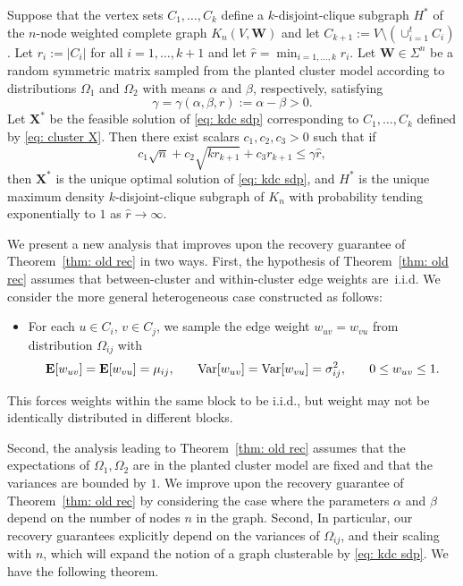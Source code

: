 \documentclass[twoside,11pt]{article}
\newcommand{\E}{\mathbf{E}}
\newcommand{\bs}{\boldsymbol}
\newcommand{\X}{\bs {X}}
\newcommand{\W}{\bs {W}}
\newcommand{\0}{\bs{0}}
\newcommand{\rbra}[1]{\ensuremath{\left( #1 \right)}} %
\newcommand{\ra}{\rightarrow}
\newcommand{\kdc}{\(k\)-disjoint-clique }
\begin{document}
{\begin{theorem}
	\label{thm: old rec}
	Suppose that the vertex sets \(C_1, \dots, C_k\) define a \kdc subgraph \(H^*\) of the
	\(n\)-node weighted complete graph \(K_n(V, \W)\) and let \(C_{k+1} := V \setminus \rbra{ \cup^t_{i=1} C_i } \).
	Let \(r_i := |C_i|\) for all \(i=1,\dots, k+1\)
	and let \( \hat r = \min_{i=1,\dots,k} r_i.\)
	Let \( \W \in \Sigma^n\) be a random symmetric matrix sampled from the planted cluster model
	according to distributions \(\Omega_1\) and \(\Omega_2\) with means \(\alpha\) and \( \beta\), respectively,	satisfying
	\[
	\gamma = \gamma(\alpha, \beta, r):=
	\alpha - \beta > 0.
	\]
	Let \(\X^*\) be the feasible solution of \eqref{eq: kdc sdp} corresponding to \(C_1,\dots, C_k\)
	defined by \eqref{eq: cluster X}.
	Then there exist scalars \(c_1, c_2, c_3 > 0\) such that if
	\begin{equation} \label{eq: old rec}
	c_1 \sqrt{n} + c_2 \sqrt{k r_{k+1}} + c_3 r_{k+1} \le \gamma \hat r,
	\end{equation}
	then \( \X^* \) is the unique optimal solution of \eqref{eq: kdc sdp},
	and \( H^*\) is the unique maximum density \kdc subgraph of \(K_n\)
	with probability tending exponentially to \(1\) as \(\hat r \ra \infty\).
\end{theorem}
%
We present a new analysis that improves upon the recovery guarantee of Theorem~\ref{thm: old rec} in two ways.
First, the hypothesis of Theorem~\ref{thm: old rec} assumes that between-cluster and within-cluster edge weights are~i.i.d. We consider the more general heterogeneous case constructed as follows:
\begin{itemize}
	\item For each $u \in C_i$, $v \in C_j$, we sample the edge weight $w_{uv} = w_{vu}$ from distribution $\Omega_{ij}$ with
	\[
	\E[w_{uv}]  = \E[w_{vu}] = \mu_{ij}, \hspace{0.25in}
	\text{Var}[w_{uv}] = \text{Var}[w_{vu}] = \sigma^2_{ij},
	\hspace{0.25in}
	0 \le w_{uv} \le 1.
	\]
\end{itemize}
This forces weights within the same block to be i.i.d., but weight may not be identically distributed in different blocks.

Second, the analysis leading to Theorem~\ref{thm: old rec} assumes that the expectations of \(\Omega_{1}, \Omega_2\) are
in the planted cluster model are fixed and that the variances are bounded by \(1\).
We improve upon the recovery guarantee of Theorem~\ref{thm: old rec} by considering the case
where the parameters \(\alpha\) and \(\beta\) depend on the number of nodes \(n\) in the graph.
Second,
In particular, our recovery guarantees explicitly depend on the
variances of \(\Omega_{ij}\), and their scaling with $n$, which will expand the notion of a graph
clusterable by \eqref{eq: kdc sdp}. We have the following theorem.

}
\end{document}
